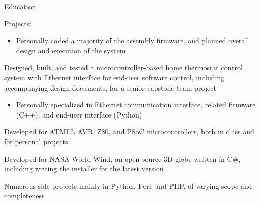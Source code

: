 \documentclass[letterpaper,10pt]{article}
\newenvironment{res_section}[1]{%
  \vskip 6pt
  \noindent
  {\Large \textbf{#1}}\\
  \rule[8pt]{\textwidth}{0.5pt}
  \vskip -8pt
}{
}
\newenvironment{res_subsection}[1]{%
  \vskip 4pt
  \noindent
  \textbf{\large{#1}}
  \begin{itemize}
}{
  \end{itemize}
}
\begin{document}
\begin{res_section}{Education}
\begin{res_subsection}{Projects:}
\begin{itemize}
    \item Personally coded a majority of the assembly firmware, and planned overall design and execution of the system
  \end{itemize}
  \item Designed, built, and tested a microcontroller-based home thermostat control system with Ethernet interface for end-user software control, including accompanying design documents, for a senior capstone team project
  \begin{itemize}
    \item Personally specialized in Ethernet communication interface, related firmware (C++), and end-user interface (Python)
  \end{itemize}
  \item Developed for ATMEL AVR, Z80, and PSoC microcontrollers, both in class and for personal projects
  \item Developed for NASA World Wind, an open-source 3D globe written in C\#, including writing the installer for the latest version
  \item Numerous side projects mainly in Python, Perl, and PHP, of varying scope and completeness
\end{res_subsection}
\end{res_section}
\end{document}
